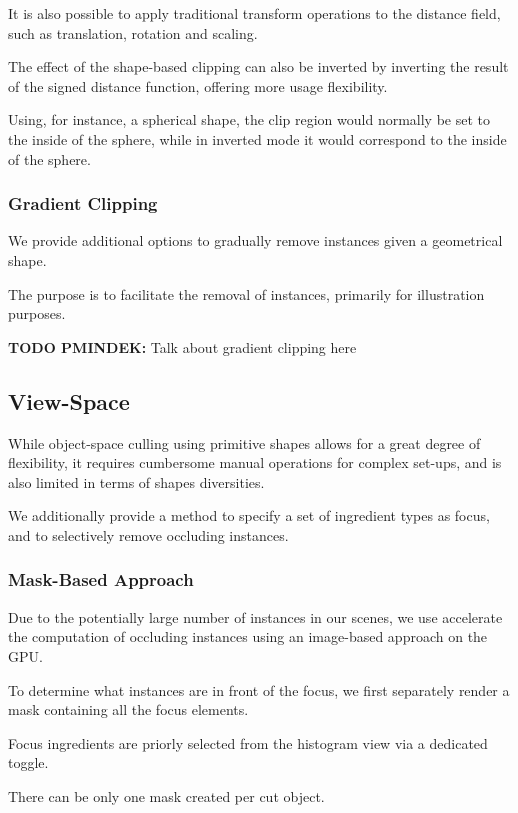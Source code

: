 It is also possible to apply traditional transform operations to the distance field, such as translation, rotation and scaling.

The effect of the shape-based clipping can also be inverted by inverting the result of the signed distance function, offering more usage flexibility.

Using, for instance, a spherical shape, the clip region would normally be set to the inside of the sphere, while in inverted mode it would correspond to the inside of the sphere. 

\subsubsection{Gradient Clipping}

We provide additional options to gradually remove instances given a geometrical shape.

The purpose is to facilitate the removal of instances, primarily for illustration purposes.

\textbf{TODO PMINDEK:} Talk about gradient clipping here


\subsection{View-Space}

While object-space culling using primitive shapes allows for a great degree of flexibility, it requires cumbersome manual operations for complex set-ups, and is also limited in terms of shapes diversities.

We additionally provide a method to specify a set of ingredient types as focus, and to selectively remove occluding instances.

\subsubsection{Mask-Based Approach}

Due to the potentially large number of instances in our scenes, we use accelerate the computation of occluding instances using an image-based approach on the GPU.

To determine what instances are in front of the focus, we first separately render a mask containing all the focus elements.

Focus ingredients are priorly selected from the histogram view via a dedicated toggle.

There can be only one mask created per cut object.

